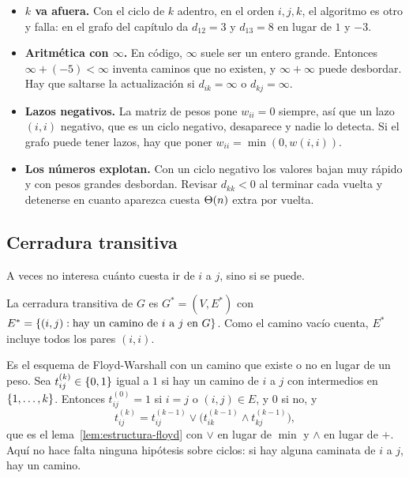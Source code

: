 \documentclass[11pt,letterpaper]{article}
\begin{document}
\begin{ojo}[breakable]
  \begin{itemize}[itemsep=0.2em, leftmargin=1.2em]
    \item \textbf{$k$ va afuera.} Con el ciclo de $k$ adentro, en el
          orden $i, j, k$, el algoritmo es otro y falla: en el grafo
          del capítulo da $d_{12} = 3$ y $d_{13} = 8$ en lugar de $1$
          y $-3$.
    \item \textbf{Aritmética con $\infty$.} En código, $\infty$ suele
          ser un entero grande. Entonces $\infty + (-5) < \infty$
          inventa caminos que no existen, y $\infty + \infty$ puede
          desbordar. Hay que saltarse la actualización si
          $d_{ik} = \infty$ o $d_{kj} = \infty$.
    \item \textbf{Lazos negativos.} La matriz de pesos pone
          $w_{ii} = 0$ siempre, así que un lazo $(i, i)$ negativo, que
          es un ciclo negativo, desaparece y nadie lo detecta. Si el
          grafo puede tener lazos, hay que poner
          $w_{ii} = \min(0, w(i, i))$.
    \item \textbf{Los números explotan.} Con un ciclo negativo los
          valores bajan muy rápido y con pesos grandes desbordan.
          Revisar $d_{kk} < 0$ al terminar cada vuelta y detenerse en
          cuanto aparezca cuesta $\Theta\!\left(n\right)$ extra por vuelta.
  \end{itemize}
\end{ojo}


\subsection*{Cerradura transitiva}

A veces no interesa cuánto cuesta ir de $i$ a $j$, sino si se puede.

\begin{definicion}
  \label{def:cerradura-pares}
  La cerradura transitiva de $G$ es $G^* = (V, E^*)$ con
  $E^* = \left\{ (i, j) : \text{hay un camino de } i \text{ a } j
  \text{ en } G \right\}$. Como el camino vacío cuenta, $E^*$ incluye todos
  los pares $(i, i)$.
\end{definicion}

Es el esquema de Floyd-Warshall con un camino que existe o no en lugar
de un peso. Sea $t^{(k)}_{ij} \in \left\{ 0, 1 \right\}$ igual a $1$ si hay un
camino de $i$ a $j$ con intermedios en $\left\{ 1, \dots, k \right\}$. Entonces
$t^{(0)}_{ij} = 1$ si $i = j$ o $(i, j) \in E$, y $0$ si no, y
\[
  t^{(k)}_{ij} = t^{(k-1)}_{ij} \lor
                 \bigl( t^{(k-1)}_{ik} \land t^{(k-1)}_{kj} \bigr) ,
\]
que es el lema~\ref{lem:estructura-floyd} con $\lor$ en lugar de
$\min$ y $\land$ en lugar de $+$. Aquí no hace falta ninguna hipótesis
sobre ciclos: si hay alguna caminata de $i$ a $j$, hay un camino.
\end{document}
